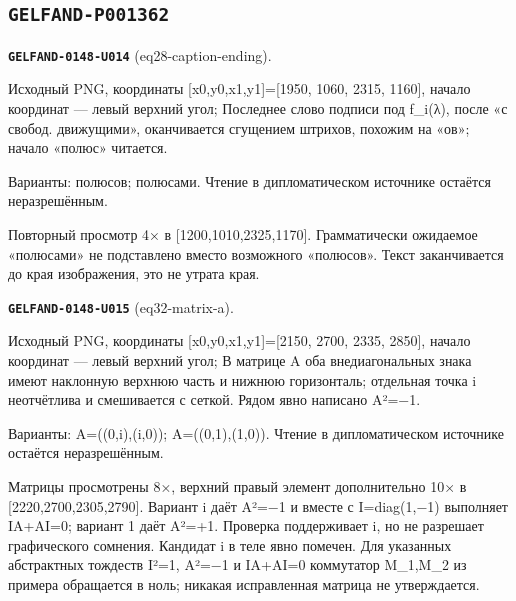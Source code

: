 \documentclass[11pt]{article}
\theoremstyle{definition}
\theoremstyle{remark}
\begin{document}
\subsection*{\texttt{GELFAND-P001362}}
\noindent\leavevmode{}\label{GELFAND-P001362:eq28-caption-ending:note}\textbf{\texttt{GELFAND-0148-U014}} (eq28-caption-ending).\par\nopagebreak[4]
Исходный PNG, координаты [x0,y0,x1,y1]=[1950, 1060, 2315, 1160], начало координат — левый верхний угол; Последнее слово подписи под f\_i(λ), после «с свобод. движущими», оканчивается сгущением штрихов, похожим на «ов»; начало «полюс» читается.\par
Варианты: полюсов; полюсами. Чтение в дипломатическом источнике остаётся неразрешённым.\par
Повторный просмотр 4× в [1200,1010,2325,1170]. Грамматически ожидаемое «полюсами» не подставлено вместо возможного «полюсов». Текст заканчивается до края изображения, это не утрата края.\par\medskip
\noindent\leavevmode{}\label{GELFAND-P001362:eq32-matrix-a:note}\textbf{\texttt{GELFAND-0148-U015}} (eq32-matrix-a).\par\nopagebreak[4]
Исходный PNG, координаты [x0,y0,x1,y1]=[2150, 2700, 2335, 2850], начало координат — левый верхний угол; В матрице A оба внедиагональных знака имеют наклонную верхнюю часть и нижнюю горизонталь; отдельная точка i неотчётлива и смешивается с сеткой. Рядом явно написано A²=−1.\par
Варианты: A=((0,i),(i,0)); A=((0,1),(1,0)). Чтение в дипломатическом источнике остаётся неразрешённым.\par
Матрицы просмотрены 8×, верхний правый элемент дополнительно 10× в [2220,2700,2305,2790]. Вариант i даёт A²=−1 и вместе с I=diag(1,−1) выполняет IA+AI=0; вариант 1 даёт A²=+1. Проверка поддерживает i, но не разрешает графического сомнения. Кандидат i в теле явно помечен. Для указанных абстрактных тождеств I²=1, A²=−1 и IA+AI=0 коммутатор M\_1,M\_2 из примера обращается в ноль; никакая исправленная матрица не утверждается.\par\medskip
\end{document}
